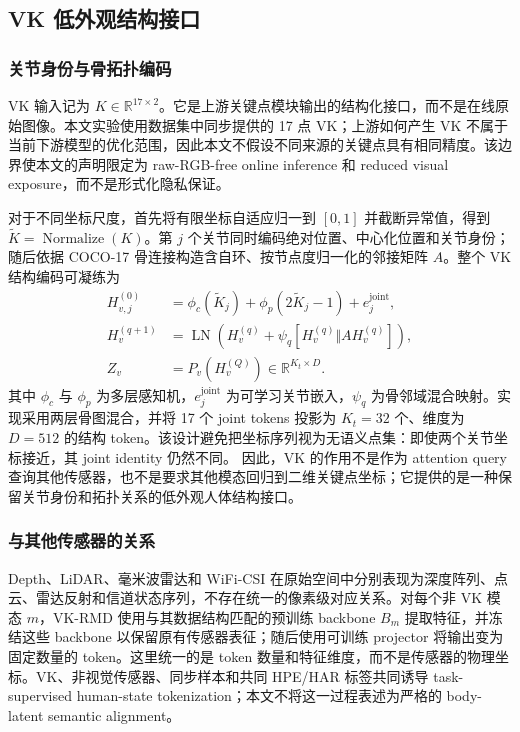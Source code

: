 \documentclass[journal]{IEEEtran}
\begin{document}
\subsection{VK 低外观结构接口}

\subsubsection{关节身份与骨拓扑编码}

VK 输入记为 $K\in\mathbb{R}^{17\times2}$。它是上游关键点模块输出的结构化接口，而不是在线原始图像。本文实验使用数据集中同步提供的 17 点 VK；上游如何产生 VK 不属于当前下游模型的优化范围，因此本文不假设不同来源的关键点具有相同精度。该边界使本文的声明限定为 raw-RGB-free online inference 和 reduced visual exposure，而不是形式化隐私保证。

对于不同坐标尺度，首先将有限坐标自适应归一到 $[0,1]$ 并截断异常值，得到 $\widetilde K=\operatorname{Normalize}(K)$。第 $j$ 个关节同时编码绝对位置、中心化位置和关节身份；随后依据 COCO-17 骨连接构造含自环、按节点度归一化的邻接矩阵 $A$。整个 VK 结构编码可凝练为
\begin{equation}
\begin{aligned}
H_{v,j}^{(0)}&=\phi_c(\widetilde K_j)+\phi_p(2\widetilde K_j-1)+e_j^{\mathrm{joint}},\\
H_v^{(q+1)}&=\operatorname{LN}\!\left(H_v^{(q)}+
\psi_q[H_v^{(q)}\Vert A H_v^{(q)}]\right),\\
Z_v&=P_v(H_v^{(Q)})\in\mathbb R^{K_t\times D}.
\end{aligned}
\label{eq:vk_structural_interface}
\end{equation}
其中 $\phi_c$ 与 $\phi_p$ 为多层感知机，$e_j^{\mathrm{joint}}$ 为可学习关节嵌入，$\psi_q$ 为骨邻域混合映射。实现采用两层骨图混合，并将 17 个 joint tokens 投影为 $K_t=32$ 个、维度为 $D=512$ 的结构 token。该设计避免把坐标序列视为无语义点集：即使两个关节坐标接近，其 joint identity 仍然不同。
因此，VK 的作用不是作为 attention query 查询其他传感器，也不是要求其他模态回归到二维关键点坐标；它提供的是一种保留关节身份和拓扑关系的低外观人体结构接口。

\subsubsection{与其他传感器的关系}

Depth、LiDAR、毫米波雷达和 WiFi-CSI 在原始空间中分别表现为深度阵列、点云、雷达反射和信道状态序列，不存在统一的像素级对应关系。对每个非 VK 模态 $m$，VK-RMD 使用与其数据结构匹配的预训练 backbone $B_m$ 提取特征，并冻结这些 backbone 以保留原有传感器表征；随后使用可训练 projector 将输出变为固定数量的 token。这里统一的是 token 数量和特征维度，而不是传感器的物理坐标。VK、非视觉传感器、同步样本和共同 HPE/HAR 标签共同诱导 task-supervised human-state tokenization；本文不将这一过程表述为严格的 body-latent semantic alignment。
\end{document}
